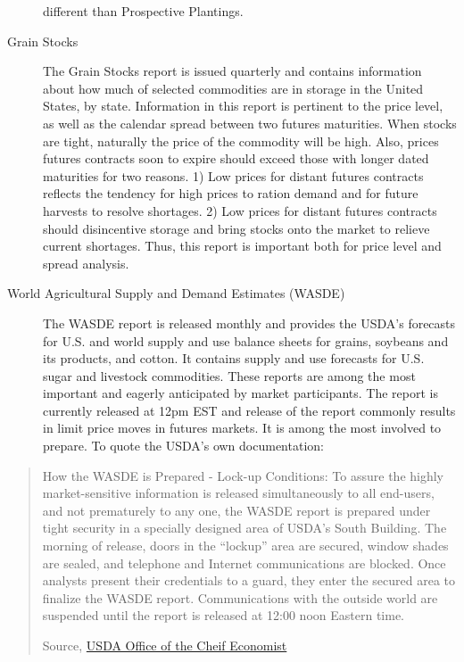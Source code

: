 \documentclass[
  letterpaper,
  DIV=11,
  numbers=noendperiod]{scrreprt}
\begin{document}
\begin{description}
different than Prospective Plantings.
\item[Grain Stocks]
The Grain Stocks report is issued quarterly and contains information
about how much of selected commodities are in storage in the United
States, by state. Information in this report is pertinent to the price
level, as well as the calendar spread between two futures maturities.
When stocks are tight, naturally the price of the commodity will be
high. Also, prices futures contracts soon to expire should exceed those
with longer dated maturities for two reasons. 1) Low prices for distant
futures contracts reflects the tendency for high prices to ration demand
and for future harvests to resolve shortages. 2) Low prices for distant
futures contracts should disincentive storage and bring stocks onto the
market to relieve current shortages. Thus, this report is important both
for price level and spread analysis.
\item[World Agricultural Supply and Demand Estimates (WASDE)]
The WASDE report is released monthly and provides the USDA's forecasts
for U.S. and world supply and use balance sheets for grains, soybeans
and its products, and cotton. It contains supply and use forecasts for
U.S. sugar and livestock commodities. These reports are among the most
important and eagerly anticipated by market participants. The report is
currently released at 12pm EST and release of the report commonly
results in limit price moves in futures markets. It is among the most
involved to prepare. To quote the USDA's own documentation:
\end{description}

\begin{quote}
How the WASDE is Prepared - Lock-up Conditions: To assure the highly
market-sensitive information is released simultaneously to all
end-users, and not prematurely to any one, the WASDE report is prepared
under tight security in a specially designed area of USDA's South
Building. The morning of release, doors in the ``lockup'' area are
secured, window shades are sealed, and telephone and Internet
communications are blocked. Once analysts present their credentials to a
guard, they enter the secured area to finalize the WASDE report.
Communications with the outside world are suspended until the report is
released at 12:00 noon Eastern time.

Source, \href{http://www.usda.gov/oce/commodity/wasde/prepared.htm}{USDA
Office of the Cheif Economist}
\end{quote}
\end{document}
